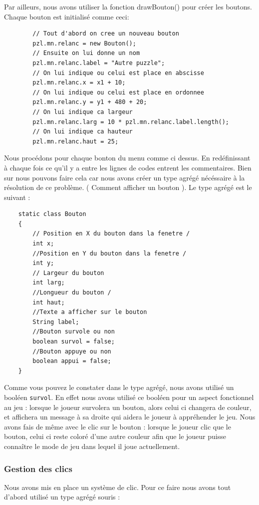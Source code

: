 \documentclass[]{article}
\newcommand{\variable}[1]{\noindent \texttt{#1}}
\begin{document}
Par ailleurs, nous avons utiliser la fonction drawBouton() pour créer les boutons. Chaque bouton est initialisé comme ceci: 

\begin{lstlisting}
		// Tout d'abord on cree un nouveau bouton
        pzl.mn.relanc = new Bouton(); 
		// Ensuite on lui donne un nom 
        pzl.mn.relanc.label = "Autre puzzle";
		// On lui indique ou celui est place en abscisse 
        pzl.mn.relanc.x = x1 + 10;
        // On lui indique ou celui est place en ordonnee
        pzl.mn.relanc.y = y1 + 480 + 20;
        // On lui indique ca largeur
        pzl.mn.relanc.larg = 10 * pzl.mn.relanc.label.length();
        // On lui indique ca hauteur
        pzl.mn.relanc.haut = 25;
\end{lstlisting}
Nous procédons pour chaque bonton du menu comme ci dessus. En redéfinissant à chaque fois ce qu'il y a entre les lignes de codes entrent les commentaires. Bien sur nous pouvons faire cela car nous avons créer un type agrégé nécéssaire à la résolution de ce problème. ( Comment afficher un bouton ). Le type agrégé est le suivant : 

\begin{lstlisting}
    static class Bouton
    {
        // Position en X du bouton dans la fenetre /
        int x;
        //Position en Y du bouton dans la fenetre /
        int y;
        // Largeur du bouton 
        int larg;
        //Longueur du bouton /
        int haut;
        //Texte a afficher sur le bouton 
        String label;
        //Bouton survole ou non 
        boolean survol = false;
        //Bouton appuye ou non 
        boolean appui = false;
    } 
\end{lstlisting}

Comme vous pouvez le constater dans le type agrégé, nous avons utilisé un booléen \variable{survol}. En effet nous avons utilisé ce booléen pour un aspect fonctionnel au jeu : lorsque le joueur survolera un bouton, alors celui ci changera de couleur, et affichera un message à sa droite qui aidera le joueur à appréhender le jeu. Nous avons fais de même avec le clic sur le bouton : lorsque le joueur clic que le bouton, celui ci reste coloré d'une autre couleur afin que le joueur puisse connaître le mode de jeu dans lequel il joue actuellement. 
\newpage
\subsubsection{Gestion des clics}

Nous avons mis en place un système de clic. Pour ce faire nous avons tout d'abord utilisé un type agrégé souris : 
\end{document}
